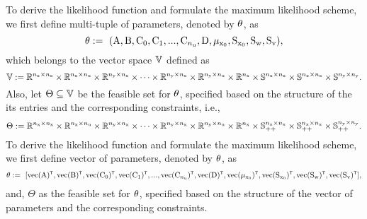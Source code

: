 To derive the likelihood function and formulate the maximum likelihood scheme, we first define multi-tuple of parameters, denoted by  ${ \mathrm{\theta} }$, as
\begin{equation}
    {{ \mathrm{\theta} }} 
    := 
    \,\,(
    { \mathrm{A} }, 
    { \mathrm{B} }, 
    { \mathrm{C} }_0,{ \mathrm{C} }_1,...,{ \mathrm{C} }_{n_{ \mathrm{u} }}, 
    { \mathrm{D} }, 
    { \mathrm{\mu} }_{{ \mathrm{x} }_0},
    { \mathrm{S} }_{{ \mathrm{x} }_0},
    { \mathrm{S} }_{ \mathrm{w} },{ \mathrm{S} }_{ \mathrm{v} }),
    \end{equation}
which belongs to the vector space ${\mathbb{V}}$ defined as
\begin{equation}
    {\mathbb{V}}:=
    {\mathbb{R}}^{n_{ \mathrm{x} }\times n_{ \mathrm{x} }} 
    \times
    {\mathbb{R}}^{n_{ \mathrm{x} }\times n_{ \mathrm{u} }} 
    \times
    {\mathbb{R}}^{n_{ \mathrm{y} }\times n_{ \mathrm{x} }} 
    \times
    \cdots
    \times 
    {\mathbb{R}}^{n_{ \mathrm{y} }\times n_{ \mathrm{x} }} 
    \times
    {\mathbb{R}}^{n_{ \mathrm{y} }\times n_{ \mathrm{u} }} 
    \times
    {\mathbb{R}}^{n_{ \mathrm{x} }} 
    \times
    {\mathbb{S}}^{n_{ \mathrm{x} }\times n_{ \mathrm{x} }} 
    \times
    {\mathbb{S}}^{n_{ \mathrm{x} }\times n_{ \mathrm{x} }} 
    \times
    {\mathbb{S}}^{n_{ \mathrm{y} }\times n_{ \mathrm{y} }}. 
\end{equation}
Also, let $\Theta \subseteq {\mathbb{V}}$ be the feasible set for ${ \mathrm{\theta} }$, specified based on the structure of the its entries and the corresponding constraints, i.e.,
\begin{equation}
    \Theta :=
    {\mathbb{R}}^{n_{ \mathrm{x} }\times n_{ \mathrm{x} }} 
    \times
    {\mathbb{R}}^{n_{ \mathrm{x} }\times n_{ \mathrm{u} }} 
    \times
    {\mathbb{R}}^{n_{ \mathrm{y} }\times n_{ \mathrm{x} }} 
    \times
    \cdots
    \times 
    {\mathbb{R}}^{n_{ \mathrm{y} }\times n_{ \mathrm{x} }} 
    \times
    {\mathbb{R}}^{n_{ \mathrm{y} }\times n_{ \mathrm{u} }} 
    \times
    {\mathbb{R}}^{n_{ \mathrm{x} }} 
    \times
    {\mathbb{S}}_{++}^{n_{ \mathrm{x} }\times n_{ \mathrm{x} }} 
    \times
    {\mathbb{S}}_{++}^{n_{ \mathrm{x} }\times n_{ \mathrm{x} }} 
    \times
    {\mathbb{S}}_{++}^{n_{ \mathrm{y} }\times n_{ \mathrm{y} }}. 
\end{equation}
\iffalse
To derive the likelihood function and formulate the maximum likelihood scheme, we first define vector of parameters, denoted by  ${ \mathrm{\theta} }$, as
\begin{equation}
    \begin{split}
     {\vctheta} :  =\,\,[\vec({\mxA})^\tr , \vec({\mxB})^\tr,\vec({\mxC}_0)^\tr,\vec({\mxC}_1)^\tr,...,\vec({\mxC}_{\Nu})^\tr, \vec({\mxD})^\tr, \vec({\vcmu}_{\vcx_0})^\tr,\vec({\mxS}_{\vcx_0})^\tr,\vec({\mxS}_\vcw)^\tr,\vec({\mxS}_\vcv)^\tr],
    \end{split}
\end{equation}
and, $\Theta$ as the feasible set for ${ \mathrm{\theta} }$, specified based on the structure of the vector of parameters and the corresponding constraints.
